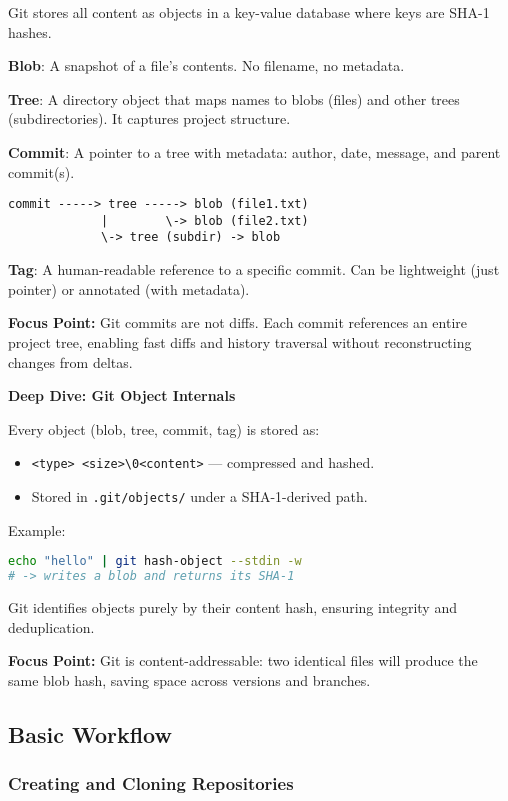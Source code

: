 \documentclass[a4paper,12pt]{article}
\begin{document}
Git stores all content as objects in a key-value database where keys are SHA-1 hashes.

\textbf{Blob}:
A snapshot of a file's contents. No filename, no metadata.

\textbf{Tree}:
A directory object that maps names to blobs (files) and other trees (subdirectories). It captures project structure.

\textbf{Commit}:
A pointer to a tree with metadata: author, date, message, and parent commit(s).

\begin{verbatim}
commit -----> tree -----> blob (file1.txt)
             |        \-> blob (file2.txt)
             \-> tree (subdir) -> blob
\end{verbatim}

\textbf{Tag}:
A human-readable reference to a specific commit. Can be lightweight (just pointer) or annotated (with metadata).

\textbf{Focus Point:} Git commits are not diffs. Each commit references an entire project tree, enabling fast diffs and history traversal without reconstructing changes from deltas.

\textbf{Deep Dive: Git Object Internals}

Every object (blob, tree, commit, tag) is stored as:
\begin{itemize}
  \item \texttt{<type> <size>\textbackslash0<content>} — compressed and hashed.
  \item Stored in \texttt{.git/objects/} under a SHA-1-derived path.
\end{itemize}

Example:
\begin{lstlisting}[language=bash]
echo "hello" | git hash-object --stdin -w
# -> writes a blob and returns its SHA-1
\end{lstlisting}

Git identifies objects purely by their content hash, ensuring integrity and deduplication.

\textbf{Focus Point:} Git is content-addressable: two identical files will produce the same blob hash, saving space across versions and branches.

\subsection{Basic Workflow}

\subsubsection{Creating and Cloning Repositories}
\end{document}

